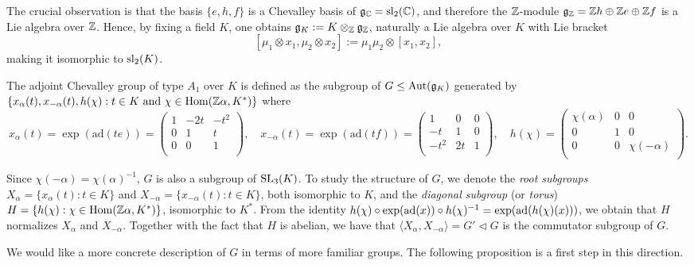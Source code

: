 The crucial observation is that the basis $\{e,h,f\}$ is a Chevalley basis of $\mathfrak{g}_{\mathbb{C}}=\mathrm{sl}_2(\mathbb{C})$, and therefore the $\mathbb{Z}$-module $\mathfrak{g}_{\mathbb{Z}}=\mathbb{Z} h\oplus\mathbb{Z} e\oplus\mathbb{Z} f$ is a Lie algebra over $\mathbb{Z}$. Hence, by fixing a field $K$, one obtains $\mathfrak{g}_K:=K\otimes_{\mathbb{Z}}\mathfrak{g}_{\mathbb{Z}}$, naturally a Lie algebra over $K$ with Lie bracket
$$[\mu_1\otimes x_1,\mu_2\otimes x_2]:=\mu_1\mu_2\otimes[x_1,x_2],$$
making it isomorphic to $\mathrm{sl}_2(K)$.

The adjoint Chevalley group of type $A_1$ over $K$ is defined as the subgroup of $G\leq\mathrm{Aut}(\mathfrak{g}_K)$ generated by $\{x_\alpha(t),x_{-\alpha}(t),h(\chi):t\in K\text{ and }\chi\in\mathrm{Hom}(\mathbb{Z}\alpha,K^*)\}$ where
$$x_\alpha(t)=\exp(\mathrm{ad}(te))=\begin{pmatrix}
    1 & -2t & -t^2\\
    0 & 1 & t\\
    0 & 0 & 1\\
\end{pmatrix},\quad x_{-\alpha}(t)=\exp(\mathrm{ad}(tf))=\begin{pmatrix}
    1 & 0 & 0\\
    -t & 1 & 0\\
    -t^2 & 2t & 1\\
\end{pmatrix},\quad h(\chi)=\begin{pmatrix}
    \chi(\alpha) & 0 & 0\\
    0 & 1 & 0\\
    0 & 0 & \chi(-\alpha)\\
\end{pmatrix}.$$

Since $\chi(-\alpha)=\chi(\alpha)^{-1}$, $G$ is also a subgroup of $\mathrm{SL}_3(K)$. To study the structure of $G$, we denote the \textit{root subgroups} $X_\alpha=\{x_\alpha(t):t\in K\}$ and $X_{-\alpha}=\{x_{-\alpha}(t):t\in K\}$, both isomorphic to $K$, and the \textit{diagonal subgroup} (or \textit{torus}) $H=\{h(\chi):\chi\in\mathrm{Hom}(\mathbb{Z}\alpha,K^*)\}$, isomorphic to $K^*$. 
From the identity $h(\chi)\circ\exp(\mathrm{ad}(x))\circ h(\chi)^{-1}=\exp(\mathrm{ad}(h(\chi)(x)))$, we obtain that $H$ normalizes $X_\alpha$ and $X_{-\alpha}$. Together with the fact that $H$ is abelian, we have that $\langle X_\alpha,X_{-\alpha}\rangle=G'\triangleleft G$ is the commutator subgroup of $G$. 

We would like a more concrete description of $G$ in terms of more familiar groups. The following proposition is a first step in this direction.

